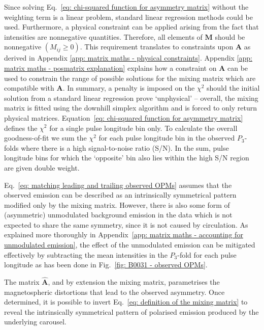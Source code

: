 Since solving Eq.~\eqref{eq: chi-squared function for asymmetry matrix} without the weighting term is a linear problem, standard linear regression methods \citep[e.g.][]{NumericalRecipes} could be used. Furthermore, a physical constraint can be applied arising from the fact that intensities are nonnegative quantities. Therefore, all elements of $\mathbf{M}$ should be nonnegative $(M_{ij} \geq 0)$. This requirement translates to constraints upon $\mathbf{A}$ as derived in Appendix \ref{app: matrix maths - physical constraints}. Appendix \ref{app: matrix maths - posmatrix explanation} explains how a constraint on $\mathbf{A}$ can be used to constrain the range of possible solutions for the mixing matrix which are compatible with $\mathbf{A}$. In summary, a penalty is imposed on the $\chi^2$ should the initial solution from a standard linear regression prove `unphysical' -- overall, the mixing matrix is fitted using the downhill simplex algorithm \citep{NMxx1965} and is forced to only return physical matrices. Equation~\eqref{eq: chi-squared function for asymmetry matrix} defines the $\chi^2$ for a single pulse longitude bin only. To calculate the overall goodness-of-fit we sum the $\chi^2$ for each pulse longitude bin in the observed $P_3$-folds where there is a high signal-to-noise ratio (S/N). In the sum, pulse longitude bins for which the `opposite' bin also lies within the high S/N region are given double weight.

Eq.~\eqref{eq: matching leading and trailing observed OPMs} assumes that the observed emission can be described as an intrinsically symmetrical pattern modified only by the mixing matrix. However, there is also some form of (asymmetric) unmodulated background emission in the data which is not expected to share the same symmetry, since it is not caused by circulation. As explained more thoroughly in Appendix~\ref{app: matrix maths - accounting for unmodulated emission}, the effect of the unmodulated emission can be mitigated effectively by subtracting the mean intensities in the $P_3$-fold for each pulse longitude as has been done in Fig.~\ref{fig: B0031 - observed OPMs}.

The matrix $\mathbf{\hat{A}}$, and by extension the mixing matrix, parametrises the magnetospheric distortions that lead to the observed asymmetry. Once determined, it is possible to invert Eq.~\eqref{eq: definition of the mixing matrix} to reveal the intrinsically symmetrical pattern of polarised emission produced by the underlying carousel.








